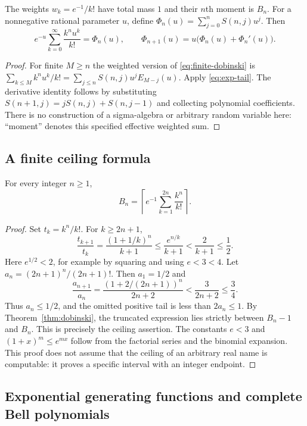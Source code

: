 \begin{corollary}
The weights $w_k=e^{-1}/k!$ have total mass $1$ and their $n$th moment is $B_n$.
For a nonnegative rational parameter $u$, define
$\Phi_n(u)=\sum_{j=0}^n S(n,j)u^j$.  Then
\begin{equation}\label{eq:poisson-touchard}
 e^{-u}\sum_{k=0}^{\infty}\frac{k^n u^k}{k!}=\Phi_n(u),
 \qquad \Phi_{n+1}(u)=u\bigl(\Phi_n(u)+\Phi_n'(u)\bigr).
\end{equation}
\end{corollary}
\begin{proof}
For finite $M\ge n$ the weighted version of
\eqref{eq:finite-dobinski} is
$\sum_{k\le M}k^nu^k/k!=\sum_{j\le n}S(n,j)u^j E_{M-j}(u)$.
Apply \eqref{eq:exp-tail}.  The derivative identity follows by substituting
$S(n+1,j)=jS(n,j)+S(n,j-1)$ and collecting polynomial coefficients.  There is
no construction of a sigma-algebra or arbitrary random variable here:
``moment'' denotes this specified effective weighted sum.
\end{proof}

\subsection{A finite ceiling formula}

\begin{theorem}\label{thm:comtet}
For every integer $n\ge1$,
\[
 B_n=\left\lceil e^{-1}\sum_{k=1}^{2n}\frac{k^n}{k!}\right\rceil.
\]
\end{theorem}
\begin{proof}
Set $t_k=k^n/k!$.  For $k\ge2n+1$,
\[
 \frac{t_{k+1}}{t_k}
 =\frac{(1+1/k)^n}{k+1}
 \le\frac{e^{n/k}}{k+1}
 <\frac2{k+1}\le\frac12.
\]
Here $e^{1/2}<2$, for example by squaring and using $e<3<4$.
Let $a_n=(2n+1)^n/(2n+1)!$.  Then $a_1=1/2$ and
\[
 \frac{a_{n+1}}{a_n}
 =\frac{(1+2/(2n+1))^n}{2n+2}
 <\frac3{2n+2}\le\frac34.
\]
Thus $a_n\le1/2$, and the omitted positive tail is less than $2a_n\le1$.
By Theorem~\ref{thm:dobinski}, the truncated expression lies strictly between
$B_n-1$ and $B_n$.  This is precisely the ceiling assertion.  The constants
$e<3$ and $(1+x)^m\le e^{mx}$ follow from the factorial series and the binomial
expansion.  This proof does not assume that the ceiling of an arbitrary real
name is computable: it proves a specific interval with an integer endpoint.
\end{proof}

\subsection{Exponential generating functions and complete Bell polynomials}

